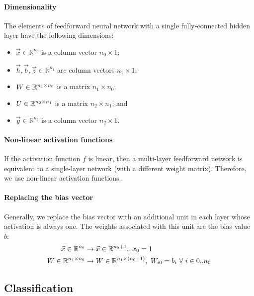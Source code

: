 \paragraph{Dimensionality}

The elements of feedforward neural network with a single fully-connected hidden
layer have the following dimensions:
\begin{itemize}
  \item $\vec{x} \in \mathbb{R}^{n_0}$ is a column vector $n_0 \times 1$;
  \item $\vec{h}, \vec{b}, \vec{z} \in \mathbb{R}^{n_1}$ are column vectors $n_1 \times 1$;
  \item $W \in \mathbb{R}^{n_1 \times n_0}$ is a matrix $n_1 \times n_0$;
  \item $U \in \mathbb{R}^{n_2 \times n_1}$ is a matrix $n_2 \times n_1$; and
  \item $\vec{y} \in \mathbb{R}^{n_2}$ is a column vector $n_2 \times 1$.
\end{itemize}

\paragraph{Non-linear activation functions}

If the activation function $f$ is linear, then a multi-layer feedforward network
is equivalent to a single-layer network (with a different weight matrix).
Therefore, we use non-linear activation functions.

\paragraph{Replacing the bias vector}

Generally, we replace the bias vector with an additional unit in each layer
whose activation is always one.
The weights associated with this unit are the bias value $b$:
\begin{align*}
  \vec{x} \in \mathbb{R}^{n_0}
   & \to \vec{x} \in \mathbb{R}^{n_0 + 1},\
  x_0 = 1                                                 \\
  W \in \mathbb{R}^{n_1 \times n_0}
   & \to W \in \mathbb{R}^{n_1 \times (n_0 + 1)},\
  W_{i0} = b_i \ \forall\ i \in 0 .. n_0                  \\
\end{align*}

\subsection{Classification}
\label{sec:7:nn-classification}

